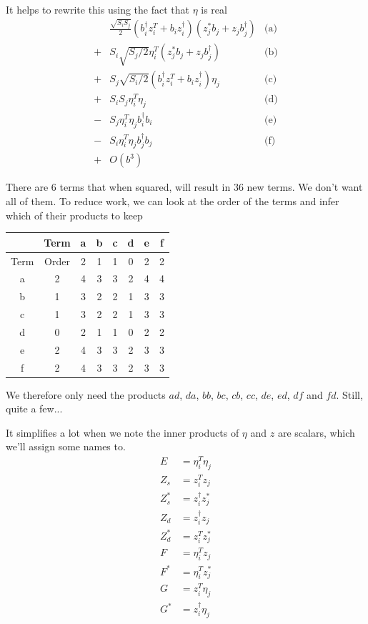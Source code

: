 \documentclass{article}
\begin{document}
It helps to rewrite this using the fact that $\eta$ is real
\[
\begin{array}{rlr}
 & \frac{\sqrt{S_i S_j}}{2} \left(b_i^\dagger z_i^T + b_i z_i^\dagger \right) \left(z_j^* b_j + z_j b_j^\dagger\right) & \text{(a)} \nonumber \\
+& S_i \sqrt{S_j/2} \eta^T_i \left(z_j^* b_j + z_j b_j^\dagger\right) & \text{(b)} \nonumber\\
+& S_j \sqrt{S_i/2} \left(b_i^\dagger z_i^T + b_i z_i^\dagger \right) \eta_j & \text{(c)} \nonumber\\
+& S_i S_j\eta_i^T \eta_j & \text{(d)} \nonumber\\
-& S_j \eta_i^T \eta_j b_i^\dagger b_i & \text{(e)} \nonumber\\
-& S_i \eta_i^T \eta_j b_j^\dagger b_j & \text{(f)} \nonumber\\
+& O(b^3) \nonumber
\end{array}
\]

There are 6 terms that when squared, will result in 36 new terms. We don't want all of them.
To reduce work, we can look at the order of the terms and infer which of their products to keep

\begin{center}
\begin{tabular}{c|c|cccccc}
     & Term  & a & b & c & d & e & f \\ \hline
Term & Order & 2 & 1 & 1 & 0 & 2 & 2 \\ \hline
   a & 2     & 4 & 3 & 3 & 2 & 4 & 4 \\
   b & 1     & 3 & 2 & 2 & 1 & 3 & 3 \\
   c & 1     & 3 & 2 & 2 & 1 & 3 & 3 \\
   d & 0     & 2 & 1 & 1 & 0 & 2 & 2 \\
   e & 2     & 4 & 3 & 3 & 2 & 3 & 3 \\
   f & 2     & 4 & 3 & 3 & 2 & 3 & 3 \\
\end{tabular}
\end{center}

We therefore only need the products $a d$, $d a$, $b b$, $b c$, $c b$, $c c$, $d e$, $e d$, $d f$ and $f d$. Still, quite a few...

It simplifies a lot when we note the inner products of $\eta$ and $z$ are scalars, which we'll assign some names to.
\begin{align}
    E &= \eta_i^T \eta_j \\
    Z_s &= z_i^T z_j \\
    Z_s^* &= z_i^\dagger z_j^* \\
    Z_d &= z_i^\dagger z_j \\
    Z_d^* &= z_i^T z_j^* \\
    F &= \eta_i^T z_j \\
    F^* &= \eta_i^T z_j^* \\
    G &= z_i^T \eta_j \\
    G^* &= z_i^\dagger \eta_j
\end{align}
\end{document}

